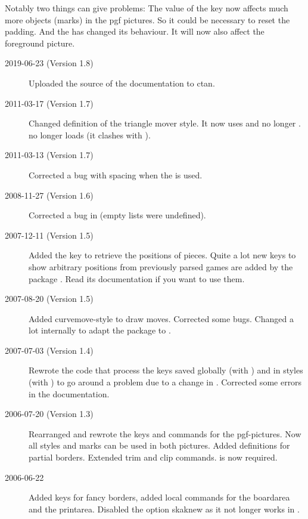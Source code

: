 \documentclass[pagesize,parskip=half-,fontsize=12pt]{scrartcl}
\begin{document}
Notably two things can give problems: The value of the
 key now affects much more objects (marks) in the pgf
pictures. So it could be necessary to reset the padding. And the
 has changed its behaviour. It will now also affect
the foreground picture.

\begin{description}
\item[2019-06-23 (Version 1.8)] Uploaded the source of the documentation to ctan.

\item[2011-03-17 (Version 1.7)] Changed definition of the triangle mover
    style. It now uses  and no longer
    .  no longer loads
     (it clashes with ).

\item[2011-03-13 (Version 1.7)] Corrected a bug with spacing when the
     is used.


\item[2008-11-27 (Version 1.6)] Corrected a bug in 
(empty lists were undefined).


\item[2007-12-11 (Version 1.5)] Added the key  to
retrieve the positions of pieces. Quite a lot new keys to show
arbitrary positions from previously parsed games are added by the
package . Read its documentation if you want to
use them.

\item[2007-08-20 (Version 1.5)] Added curvemove-style to draw moves.
Corrected some bugs. Changed a lot internally to adapt the package to
.

\item[2007-07-03 (Version 1.4)] Rewrote the code that process the
keys saved globally (with ) and  in styles (with
) to go around a problem due to a change in
. Corrected some errors in the
documentation.
\item[2006-07-20 (Version 1.3)] Rearranged and rewrote the keys and commands for
the pgf-pictures. Now all styles and marks can be used in both
pictures. Added definitions for partial borders. Extended trim and
clip commands.  is now required.
\item[2006-06-22] Added keys for fancy borders, added local commands for
the boardarea and the printarea. Disabled the option skaknew as it
not longer works in \chessfss.
\end{description}
\end{document}

